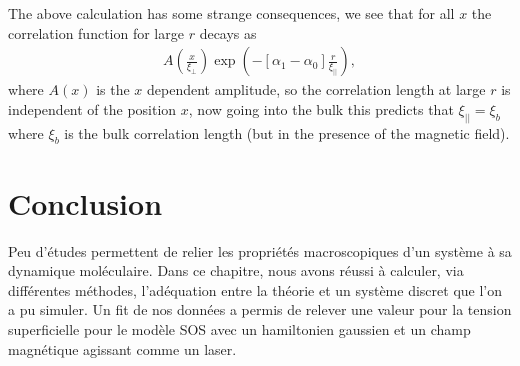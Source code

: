 The above calculation has some strange consequences, we see that for all $x$ the correlation function for large $r$ 
decays as 
\begin{align}
A(\frac{x}{\xi_\perp})\exp(-[\alpha_1-\alpha_0] \frac{r}{\xi_{||}}),
\end{align}
where $A(x)$ is the $x$ dependent amplitude, so the correlation length at large $r$ is independent of the position
$x$, now going into the bulk this predicts that $\xi_{||} = \xi_b$ where $\xi_b$ is the bulk correlation length (but in the presence of the magnetic field). 


    \section{Conclusion}

Peu d'études permettent de relier les propriétés macroscopiques d'un système à sa dynamique moléculaire. Dans ce chapitre, nous avons réussi à calculer, via différentes méthodes, l'adéquation entre la théorie et un système discret que l'on a pu simuler. Un fit de nos données a permis de relever une valeur pour la tension superficielle pour le modèle SOS avec un hamiltonien gaussien et un champ magnétique agissant comme un laser. 
